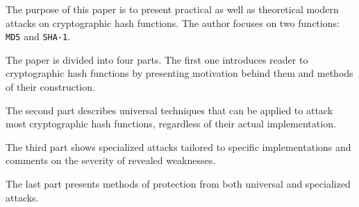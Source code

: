 The purpose of this paper is to present practical as well as theoretical modern
attacks on cryptographic hash functions. The author focuses on two functions:
\texttt{MD5} and \texttt{SHA-1}.

The paper is divided into four parts. The first one introduces reader to
cryptographic hash functions by presenting motivation behind them and  methods
of their construction.

The second part describes universal techniques that can be applied to attack
most cryptographic hash functions, regardless of their actual implementation.

The third part shows specialized attacks tailored to specific implementations
and comments on the severity of revealed weaknesses.

The last part presents methods of protection from both universal and
specialized attacks.
